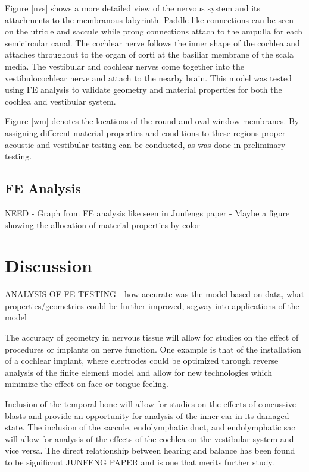 \documentclass[12pt]{article}
\begin{document}
Figure \ref{nvs} shows a more detailed view of the nervous system and its attachments to the membranous labyrinth. Paddle like connections can be seen on the utricle and saccule while prong connections attach to the ampulla for each semicircular canal. The cochlear nerve follows the inner shape of the cochlea and attaches throughout to the organ of corti at the basiliar membrane of the scala media. The vestibular and cochlear nerves come together into the vestibulocochlear nerve and attach to the nearby brain.
This model was tested using FE analysis to validate geometry and material properties for both the cochlea and vestibular system.



Figure \ref{wm} denotes the locations of the round and oval window membranes. By assigning different material properties and conditions to these regions proper acoustic and vestibular testing can be conducted, as was done in preliminary testing.

\subsection{FE Analysis}
NEED \newline - Graph from FE analysis like seen in Junfengs paper
- Maybe a figure showing the allocation of material properties by color



\section{Discussion}\label{discussion}
ANALYSIS OF FE TESTING - how accurate was the model based on data, what properties/geometries could be further improved, segway into applications of the model

The accuracy of geometry in nervous tissue will allow for studies on the effect of procedures or implants on nerve function. One example is that of the installation of a cochlear implant, where electrodes could be optimized through reverse analysis of the finite element model and allow for new technologies which minimize the effect on face or tongue feeling. 

Inclusion of the temporal bone will allow for studies on the effects of concussive blasts and provide an opportunity for analysis of the inner ear in its damaged state. The inclusion of the saccule, endolymphatic duct, and endolymphatic sac will allow for analysis of the effects of the cochlea on the vestibular system and vice versa. The direct relationship between hearing and balance has been found to be significant JUNFENG PAPER and is one that merits further study.
\end{document}
